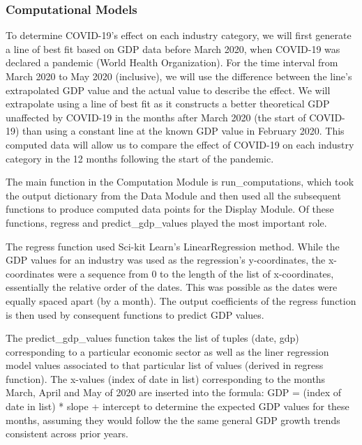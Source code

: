\documentclass[fontsize=11pt]{article}
\begin{document}
\subsubsection*{Computational Models}

To determine COVID-19’s effect on each industry category, we will first generate a line of best fit based on GDP data before March 2020, when COVID-19 was declared a pandemic (World Health Organization). For the time interval from March 2020 to May 2020 (inclusive), we will use the difference between the line’s extrapolated GDP value and the actual value to describe the effect. We will extrapolate using a line of best fit as it constructs a better theoretical GDP unaffected by COVID-19 in the months after March 2020 (the start of COVID-19) than using a constant line at the known GDP value in February 2020. This computed data will allow us to compare the effect of COVID-19 on each industry category in the 12 months following the start of the pandemic.

The main function in the Computation Module is run\_computations, which took the output dictionary from the Data Module and then used all the subsequent functions to produce computed data points for the Display Module. Of these functions, regress and predict\_gdp\_values played the most important role.


The regress function used Sci-kit Learn's LinearRegression method. While the GDP values for an industry was used as the regression's y-coordinates, the x-coordinates were a sequence from 0 to the length of the list of x-coordinates, essentially the relative order of the dates. This was possible as the dates were equally spaced apart (by a month). The output coefficients of the regress function is then used by consequent functions to predict GDP values.

The predict\_gdp\_values function takes the list of tuples (date, gdp) corresponding to a particular economic sector as well as the liner regression model values associated to that particular list of values (derived in regress function). The x-values (index of date in list) corresponding to the months March, April and May of 2020 are inserted into the formula: GDP = (index of date in list) * slope + intercept to determine the expected GDP values for these months, assuming they would follow the the same general GDP growth trends consistent across prior years.  
\end{document}
